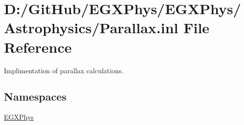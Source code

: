 \hypertarget{_parallax_8inl}{}\section{D\+:/\+Git\+Hub/\+E\+G\+X\+Phys/\+E\+G\+X\+Phys/\+Astrophysics/\+Parallax.inl File Reference}
\label{_parallax_8inl}


Implimentation of parallax calculations.  


\subsection*{Namespaces}
\begin{DoxyCompactItemize}
\item 
 \mbox{\hyperlink{namespace_e_g_x_phys}{E\+G\+X\+Phys}}
\end{DoxyCompactItemize}
